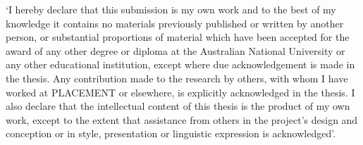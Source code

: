 %
%

\begin{originality}

`I hereby declare that this submission is my own work and to the best of my
knowledge it contains no materials previously published or written by another
person, or substantial proportions of material which have been accepted for
the award of any other degree or diploma at the Australian National University
or any other educational institution, except where due acknowledgement is made
in the thesis. Any contribution made to the research by others, with whom I
have worked at PLACEMENT or elsewhere, is explicitly acknowledged in the
thesis. I also declare that the intellectual content of this thesis is the
product of my own work, except to the extent that assistance from others in
the project's design and conception or in style, presentation or linguistic
expression is acknowledged'.

\end{originality}
